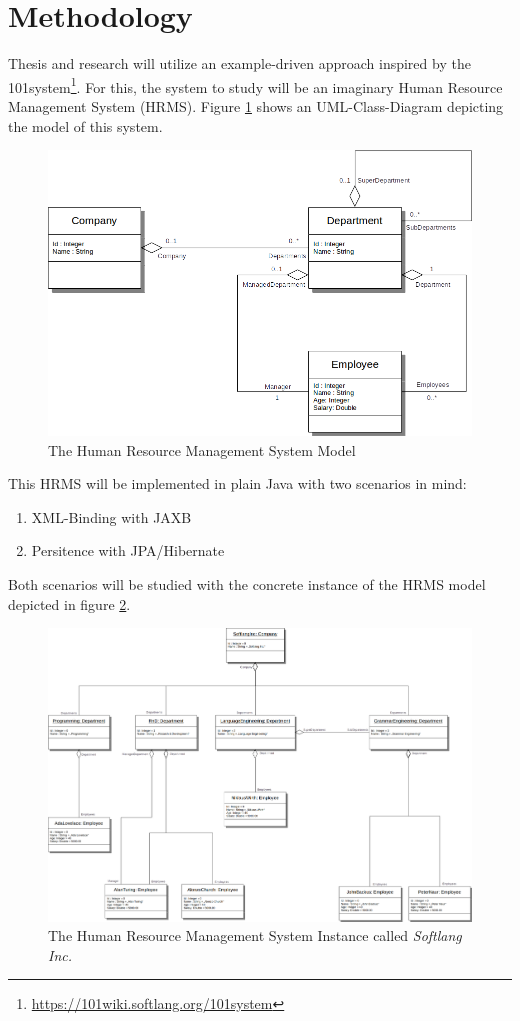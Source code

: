 \documentclass[runningheads,a4paper]{llncs}
\newcommand{\footnoteurl}[1]{\footnote{\url{#1}}}
\begin{document}
\section{Methodology}
\label{section:Methodology}
Thesis and research will utilize an example-driven approach inspired by the 101system\footnoteurl{https://101wiki.softlang.org/101system}.
For this, the system to study will be an imaginary Human Resource Management System (HRMS).
Figure \ref{figure:TheCompanyModel} shows an UML-Class-Diagram depicting the model of this system.

\begin{figure}[h!]
\centering
\includegraphics[width=.6\textwidth]{companies.png}
\caption{The Human Resource Management System Model}
\label{figure:TheCompanyModel}
\end{figure}

\noindent
This HRMS will be implemented in plain Java with two scenarios in mind:
\begin{enumerate}
\item 
XML-Binding with JAXB
\item
Persitence with JPA/Hibernate
\end{enumerate}
Both scenarios will be studied with the concrete instance of the HRMS model depicted in figure \ref{figure:TheCompanyInstanceCalledSoftlangInc}.

\begin{figure}[h!]
\centering
\includegraphics[width=.9\textwidth]{softlanginc.png}
\caption{The Human Resource Management System Instance called \textit{Softlang Inc.}}
\label{figure:TheCompanyInstanceCalledSoftlangInc}
\end{figure}
\end{document}

